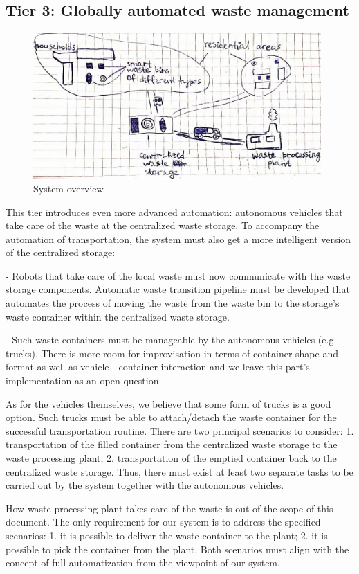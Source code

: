 \documentclass{article}
\begin{document}
\subsection{Tier 3: Globally automated waste management}

\begin{figure}[ht!]
\centering
\includegraphics[width=110mm]{./high_level_scheme.jpg}
\caption{System overview}
\end{figure}

This tier introduces even more advanced automation: autonomous vehicles that take care of the waste
at the centralized waste storage. To accompany the automation of transportation, the system must
also get a more intelligent version of the centralized storage:

- Robots that take care of the local waste must now communicate with the waste storage components.
Automatic waste transition pipeline must be developed that automates the process of moving the waste
from the waste bin to the storage's waste container within the centralized waste storage.

- Such waste containers must be manageable by the autonomous vehicles (e.g. trucks). There is more
room for improvisation in terms of container shape and format as well as vehicle - container
interaction and we leave this part's implementation as an open question.

As for the vehicles themselves, we believe that some form of trucks is a good option. Such trucks
must be able to attach/detach the waste container for the successful transportation routine. There
are two principal scenarios to consider: 1. transportation of the filled container from the
centralized waste storage to the waste processing plant; 2. transportation of the emptied container
back to the centralized waste storage. Thus, there must exist at least two separate tasks to be
carried out by the system together with the autonomous vehicles.

How waste processing plant takes care of the waste is out of the scope of this document. The only
requirement for our system is to address the specified scenarios: 1. it is possible to deliver the
waste container to the plant; 2. it is possible to pick the container from the plant. Both scenarios
must align with the concept of full automatization from the viewpoint of our system.
\end{document}

